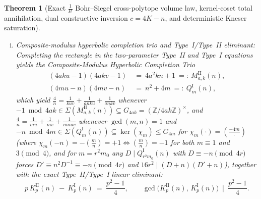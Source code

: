 \documentclass[11pt, a4paper]{article}
\theoremstyle{plain}
\newtheorem{theorem}{Theorem}[section]
\theoremstyle{definition}
\newcommand{\Z}{\mathbb{Z}}
\newcommand{\leg}[2]{\left(\frac{#1}{#2}\right)}
\begin{document}
\begin{theorem}[Exact $\frac{1}{k!}$ Bohr--Siegel cross-polytope volume law, kernel-coset total annihilation, dual constructive inversion $c=4K-n$, and deterministic Kneser saturation]
\begin{enumerate}[(a)]
\begin{enumerate}[(i)]
        \item \emph{Composite-modulus hyperbolic completion trio and Type~I/Type~II eliminant:} Completing the rectangle in the two-parameter Type~II and Type~I equations yields the \emph{Composite-Modulus Hyperbolic Completion Trio}
        \begin{equation}\label{eq:composite_modulus_hyperbolic_trio}
        \begin{split}
        (4aku-1)(4akv-1)\ &=\ 4a^{2}kn+1\ =:\ M_{a,k}^{\mathrm{II}}(n),\\
        (4mu-n)(4mv-n)\ &=\ n^{2}+4m\ =:\ Q_m^{\mathrm{I}}(n),
        \end{split}
        \end{equation}
        which yield $\frac{4}{n}=\frac{1}{kuv}+\frac{1}{anku}+\frac{1}{ankv}$ whenever $-1\bmod{4ak}\in\Sigma(M_{a,k}^{\mathrm{II}}(n))\subseteq G_{4ak}=(\Z/4ak\Z)^{\times}$, and $\frac{4}{n}=\frac{1}{mu}+\frac{1}{mv}+\frac{1}{mnuv}$ whenever $\gcd(m,n)=1$ and $-n\bmod{4m}\in\Sigma(Q_m^{\mathrm{I}}(n))\subseteq\ker(\chi_m)\le G_{4m}$ for $\chi_m(\cdot)=\leg{-4m}{\cdot}$ (where $\chi_m(-n)=-\leg{m}{n}=+1\iff\leg{m}{n}=-1$ for both $m\equiv1$ and $3\pmod 4$, and for $m=r^{2}m_0$ any $D\mid Q_{r^{2}m_0}^{\mathrm{I}}(n)$ with $D\equiv -n\pmod{4r}$ forces $D'\equiv n^{2}D^{-1}\equiv -n\pmod{4r}$ and $16r^{2}\mid(D+n)(D'+n)$), together with the exact Type~II/Type~I linear eliminant:
        \begin{equation}\label{eq:typeI_typeII_diophantine_coupling}
        p\,K_p^{\mathrm{II}}(n)\ -\ K_p^{\mathrm{I}}(n)\ =\ \frac{p^{2}-1}{4},\qquad \gcd\!\big(K_p^{\mathrm{II}}(n),\,K_p^{\mathrm{I}}(n)\big)\ \mid\ \frac{p^{2}-1}{4}.
        \end{equation}
    \end{enumerate}
\end{enumerate}
\end{theorem}
\end{document}
